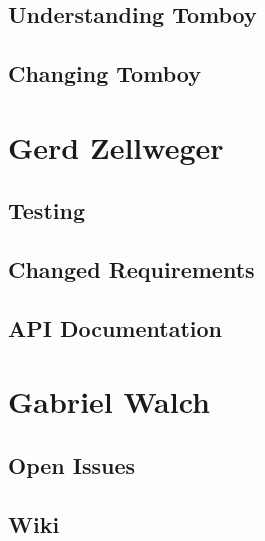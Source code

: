 \documentclass[11pt,a4paper,titlepage]{article}
\begin{document}
\subsection{Understanding Tomboy}


\subsection{Changing Tomboy}

\section{Gerd Zellweger}

\subsection{Testing}

\subsection{Changed Requirements}

\subsection{API Documentation}

\section{Gabriel Walch}

\subsection{Open Issues}

\subsection{Wiki}
\end{document}
